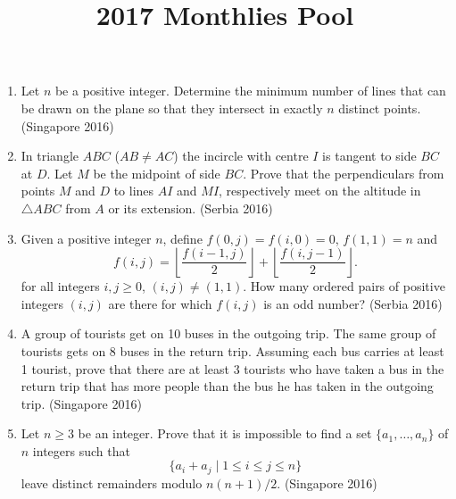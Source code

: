 \documentclass{article}
\title{2017 Monthlies Pool}
\begin{document}
	\maketitle

\begin{enumerate}
	\item Let $n$ be a positive integer. Determine the minimum number of lines that can be drawn on the plane so that they intersect in exactly $n$ distinct points. (Singapore 2016) 

	\item In triangle $ABC$ ($AB\ne AC$) the incircle with centre $I$ is tangent to side $BC$ at $D$. Let $M$ be the midpoint of side $BC$. Prove that the perpendiculars from points $M$ and $D$ to lines $AI$ and $MI$, respectively meet on the altitude in $\triangle ABC$ from $A$ or its extension. (Serbia 2016)
	
	\item Given a positive integer $n$, define $f(0,j)=f(i,0)=0$, $f(1,1)=n$ and
	\[ f(i,j) = \left\lfloor \frac{f(i-1,j)}{2}\right\rfloor + \left\lfloor \frac{f(i,j-1)}{2}\right\rfloor.\] 
	 for all integers $i,j\ge 0$, $(i,j)\ne (1,1)$. How many ordered pairs of positive integers $(i,j)$ are there for which $f(i,j)$ is an odd number? (Serbia 2016)
	
	\item A group of tourists get on 10 buses in the outgoing trip. The same group of tourists gets on 8 buses in the return trip. Assuming each bus carries at least 1 tourist, prove that there are at least 3 tourists who have taken a bus in the return trip that has more people than the bus he has taken in the outgoing trip. (Singapore 2016)
	
	\item Let $n\ge 3$ be an integer. Prove that it is impossible to find a set $\{a_1,\ldots, a_n\}$ of $n$ integers such that
	\[\{a_i+a_j \mid 1\le i\le j\le n\} \]
	leave distinct remainders modulo $n(n+1)/2$. (Singapore 2016) 
	
\end{enumerate}
\end{document}
